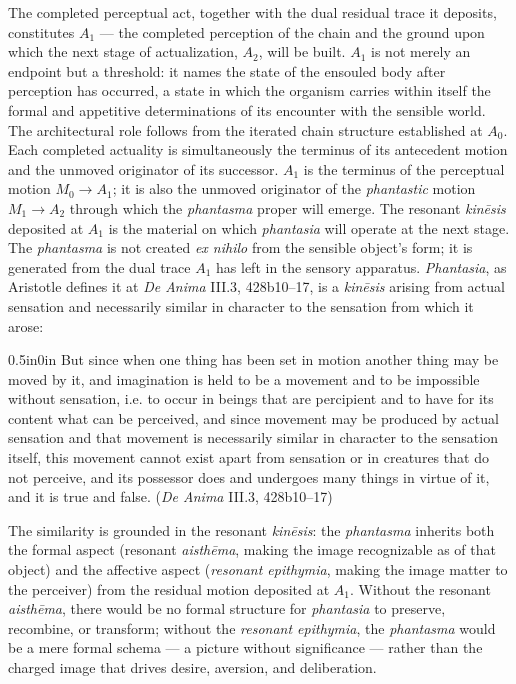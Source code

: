 The completed perceptual act, together with the dual residual trace it deposits, constitutes $A_1$ --- the completed perception of the chain and the ground upon which the next stage of actualization, $A_2$, will be built. $A_1$ is not merely an endpoint but a threshold: it names the state of the ensouled body after perception has occurred, a state in which the organism carries within itself the formal and appetitive determinations of its encounter with the sensible world. The architectural role follows from the iterated chain structure established at $A_0$. Each completed actuality is simultaneously the terminus of its antecedent motion and the unmoved originator of its successor. $A_1$ is the terminus of the perceptual motion $M_0 \rightarrow A_1$; it is also the unmoved originator of the \textit{phantastic} motion $M_1 \rightarrow A_2$ through which the \textit{phantasma} proper will emerge. The resonant \textit{kinēsis} deposited at $A_1$ is the material on which \textit{phantasia} will operate at the next stage. The \textit{phantasma} is not created \textit{ex nihilo} from the sensible object's form; it is generated from the dual trace $A_1$ has left in the sensory apparatus. \textit{Phantasia}, as Aristotle defines it at \textit{De Anima} III.3, 428b10--17, is a \textit{kinēsis} arising from actual sensation and necessarily similar in character to the sensation from which it arose:
\begin{adjustwidth}{0.5in}{0in}
But since when one thing has been set in motion another thing may be moved by it, and imagination is held to be a movement and to be impossible without sensation, i.e. to occur in beings that are percipient and to have for its content what can be perceived, and since movement may be produced by actual sensation and that movement is necessarily similar in character to the sensation itself, this movement cannot exist apart from sensation or in creatures that do not perceive, and its possessor does and undergoes many things in virtue of it, and it is true and false. (\textit{De Anima} III.3, 428b10--17)
\end{adjustwidth}
The similarity is grounded in the resonant \textit{kinēsis}: the \textit{phantasma} inherits both the formal aspect (resonant \textit{aisthēma}, making the image recognizable as of that object) and the affective aspect (\textit{resonant epithymia}, making the image matter to the perceiver) from the residual motion deposited at $A_1$. Without the resonant \textit{aisthēma}, there would be no formal structure for \textit{phantasia} to preserve, recombine, or transform; without the \textit{resonant epithymia}, the \textit{phantasma} would be a mere formal schema --- a picture without significance --- rather than the charged image that drives desire, aversion, and deliberation.

